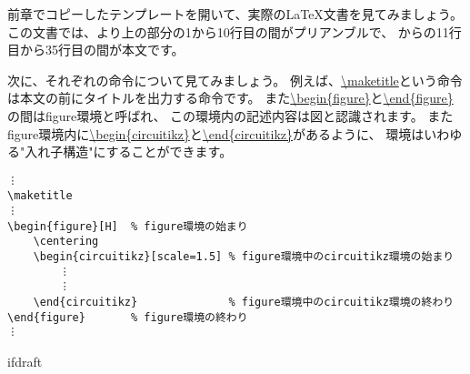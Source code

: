 		前章でコピーしたテンプレートを開いて、実際の\LaTeX 文書を見てみましょう。
		この文書では、\url{}より上の部分の1から10行目の間がプリアンブルで、
		\url{}から\url{}の11行目から35行目の間が本文です。
        
        次に、それぞれの命令について見てみましょう。
        例えば、\url{\maketitle}という命令は本文の前にタイトルを出力する命令です。
        また\url{\begin{figure}}と\url{\end{figure}}の間はfigure環境と呼ばれ、
        この環境内の記述内容は図と認識されます。
        またfigure環境内に\url{\begin{circuitikz}}と\url{\end{circuitikz}}があるように、
        環境はいわゆる"入れ子構造"にすることができます。
        \begin{mdframed}
			\begin{verbatim}
︙
\maketitle
︙
\begin{figure}[H]  % figure環境の始まり
    \centering
    \begin{circuitikz}[scale=1.5] % figure環境中のcircuitikz環境の始まり
        ︙
        ︙
    \end{circuitikz}              % figure環境中のcircuitikz環境の終わり
\end{figure}       % figure環境の終わり
︙
			\end{verbatim}
		\end{mdframed}


		\expandafter\ifx\csname ifdraft\endcsname\relax
		
		\fi